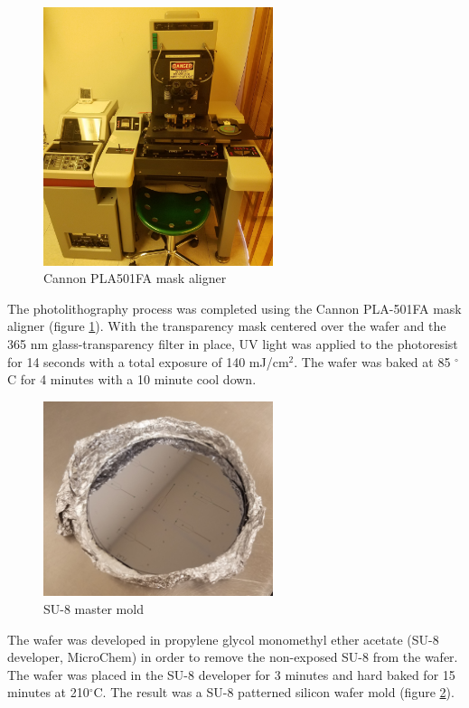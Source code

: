 \begin{figure}[h]
    \centering
    \includegraphics[width=0.6\textwidth]{images/aligner.jpg}
    \caption{Cannon PLA501FA mask aligner}
    \label{fig:mask_aligner}
\end{figure}

\par The photolithography process was completed using the Cannon PLA-501FA mask aligner (figure \ref{fig:mask_aligner}). With the transparency mask centered over the wafer and the 365 nm glass-transparency filter in place, UV light was applied to the photoresist for 14 seconds with a total exposure of 140 mJ/cm$^2$. The wafer was baked at 85 $^\circ$C for 4 minutes with a 10 minute cool down. 

\begin{figure}[H]
    \centering
    \includegraphics[width=0.6\textwidth]{images/su-8_mold.jpg}
    \caption{SU-8 master mold}
    \label{fig:SU-8_master_mold}
\end{figure}

\par The wafer was developed in propylene glycol monomethyl ether acetate (SU-8 developer, MicroChem) in order to remove the non-exposed SU-8 from the wafer. The wafer was placed in the SU-8 developer for 3 minutes and hard baked for 15 minutes at 210$^\circ$C. The result was a SU-8 patterned silicon wafer mold (figure \ref{fig:SU-8_master_mold}).

